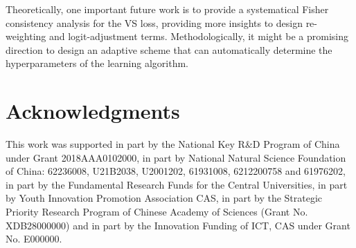 Theoretically, one important future work is to provide a systematical Fisher consistency analysis for the VS loss, providing more insights to design re-weighting and logit-adjustment terms. Methodologically, it might be a promising direction to design an adaptive scheme that can automatically determine the hyperparameters of the learning algorithm.

\section*{Acknowledgments}
This work was supported in part by the National Key R\&D Program of China under Grant 2018AAA0102000, in part by National Natural Science Foundation of China: 62236008, U21B2038, U2001202, 61931008, 6212200758 and 61976202, in part by the Fundamental Research Funds for the Central Universities, in part by Youth Innovation Promotion Association CAS, in part by the Strategic Priority Research Program of Chinese Academy of Sciences (Grant No. XDB28000000) and in part by the Innovation Funding of ICT, CAS under Grant No. E000000. 